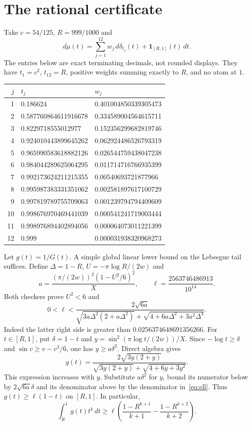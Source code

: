 \documentclass[11pt]{article}
\begin{document}
\section{The rational certificate}
Take $c=54/125$, $R=999/1000$ and
\[
 d\mu(t)=\sum_{j=1}^{12}w_j\,d\delta_{t_j}(t)+\mathbf1_{[R,1]}(t)\,dt.
\]
The entries below are exact terminating decimals, not rounded displays.
They have $t_1=c^2$, $t_{12}=R$, positive weights summing exactly to $R$,
and no atom at $1$.
\begin{center}\small
\begin{tabular}{rll}\toprule
$j$ & $t_j$ & $w_j$\\\midrule
1 & 0.186624 & 0.401004850339305473 \\
2 & 0.587760864611916678 & 0.334589004564615711 \\
3 & 0.8229718555012977 & 0.152356299682819746 \\
4 & 0.924010443899645262 & 0.062924486526793319 \\
5 & 0.965990583618882126 & 0.026544759438047238 \\
6 & 0.984044289625064295 & 0.011714716766935399 \\
7 & 0.992173624211215355 & 0.00540693721877966 \\
8 & 0.995987383331351062 & 0.002581897617100729 \\
9 & 0.997819789755709063 & 0.001239794794409609 \\
10 & 0.998676970469441039 & 0.000541241719003444 \\
11 & 0.998976894402894056 & 0.000064073011221399 \\
12 & 0.999 & 0.000031938320968273 \\
\bottomrule\end{tabular}
\end{center}

Let $g(t)=1/G(t)$. A simple global linear lower bound on the Lebesgue tail
suffices. Define $\Delta=1-R$, $U=-\pi\log R/(2w)$ and
\[
 a=\frac{(\pi/(2w))^2(1-U^2/6)^2}{X},\qquad
 \ell=\frac{2563746486913}{10^{14}}.
\]
Both checkers prove $U^2<6$ and
\begin{equation}\label{eq:ell}
 0<\ell<\frac{2\sqrt{6a}}
 {\sqrt{3a\Delta^2(2+a\Delta^2)}+
  \sqrt{4+6a\Delta^2+3a^2\Delta^4}}.
\end{equation}
Indeed the latter right side is greater than $0.0256374648691356266$.
For $t\in[R,1]$, put $\delta=1-t$ and
$y=\sin^2(\pi\log t/(2w))/X$. Since $-\log t\ge\delta$ and
$\sin v\ge v-v^3/6$, one has $y\ge a\delta^2$. Direct algebra gives
\[
 g(t)=\frac{2\sqrt{3y(2+y)}}{\sqrt{3y(2+y)}+\sqrt{4+6y+3y^2}}.
\]
This expression increases with $y$. Substitute $a\delta^2$ for $y$,
bound its numerator below by $2\sqrt{6a}\delta$ and its denominator above
by the denominator in~\eqref{eq:ell}. Thus $g(t)\ge\ell(1-t)$ on $[R,1]$.
In particular,
\[
 \int_R^1g(t)t^k\,dt\ge\ell\left(
 \frac{1-R^{k+1}}{k+1}-\frac{1-R^{k+2}}{k+2}\right).
\]
\end{document}
